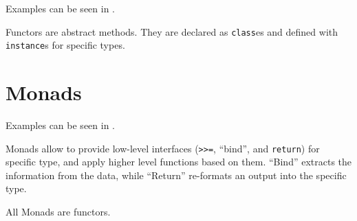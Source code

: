 \documentclass[a4paper]{article}
\begin{document}
Examples can be seen in .

Functors are abstract methods. They are declared as \verb_class_es and defined
with \verb_instance_s for specific types.

\section{Monads}

Examples can be seen in .

Monads allow to provide low-level interfaces (\verb_>>=_, ``bind'', and \verb_return_)
for specific type, and apply higher level functions based on them. ``Bind''
extracts the information from the data, while ``Return'' re-formats an output
into the specific type.

All Monads are functors.
\end{document}
